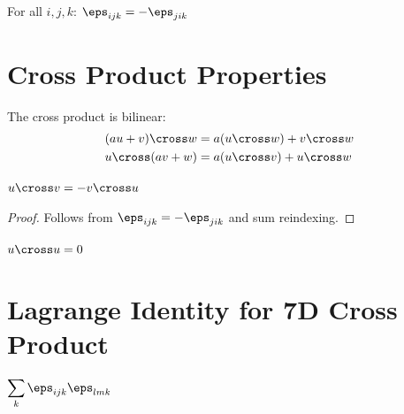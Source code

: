 \begin{theorem}\label{thm:epsilon_antisymm}
    \leanok
    For all $i, j, k$: $\eps_{ijk} = -\eps_{jik}$
\end{theorem}

\section{Cross Product Properties}

\begin{theorem}\label{thm:G2_cross_bilinear}
    \leanok
    The cross product is bilinear:
    \begin{align}
        (au + v) \cross w &= a(u \cross w) + v \cross w \\
        u \cross (av + w) &= a(u \cross v) + u \cross w
    \end{align}
\end{theorem}

\begin{theorem}\label{thm:G2_cross_antisymm}
    \leanok
    $u \cross v = -v \cross u$
\end{theorem}
\begin{proof}
    Follows from $\eps_{ijk} = -\eps_{jik}$ and sum reindexing.
\end{proof}

\begin{corollary}\label{cor:cross_self}
    \leanok
    $u \cross u = 0$
\end{corollary}

\section{Lagrange Identity for 7D Cross Product}

\begin{definition}\label{def:epsilon_contraction}
    \leanok
    $\displaystyle\sum_k \eps_{ijk} \eps_{lmk}$
\end{definition}

